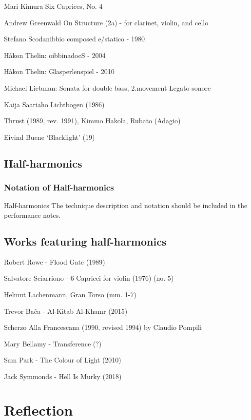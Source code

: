 Mari Kimura Six Caprices, No. 4 

Andrew Greenwald On Structure (2a) - for clarinet, violin, and cello

Stefano Scodanibbio composed e/statico - 1980

Håkon Thelin: oibbinadocS - 2004

Håkon Thelin: Glasperlenspiel - 2010

Michael Liebman: Sonata for double bass, 2.movement Legato sonore


Kaija Saariaho Lichtbogen (1986)

Thrust (1989, rev. 1991),  Kimmo Hakola, Rubato (Adagio) 

Eivind Buene `Blacklight' (19)



\subsection{Half-harmonics}

\subsubsection{Notation of Half-harmonics}
Half-harmonics 
The technique description and notation should be included in the performance notes.


\subsection{Works featuring half-harmonics}

Robert Rowe - Flood Gate (1989)

Salvatore Sciarriono - 6 Capricci for violin (1976) (no. 5)

Helmut Lachenmann, Gran Torso (mm. 1-7)

Trevor Bača - Al-Kitab Al-Khamr (2015)

Scherzo Alla Francescana (1990, revised 1994) by Claudio Pompili 

Mary Bellamy - Transference (?)

Sam Park - The Colour of Light (2010)

Jack Symmonds - Hell Is Murky (2018)

\section{Reflection}




\lipsum[4]